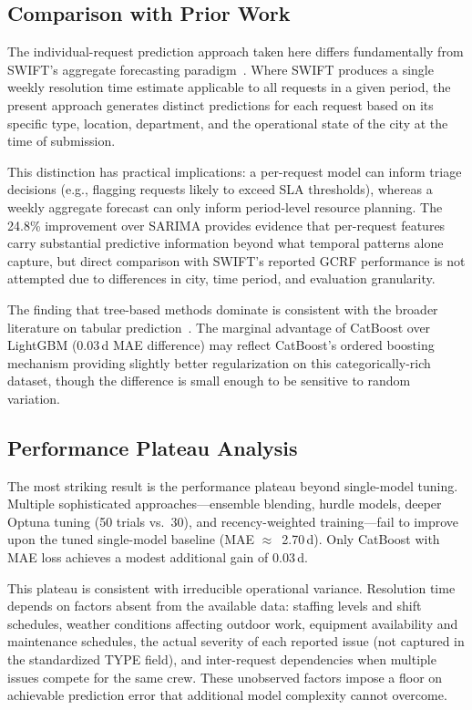 \documentclass[sigconf,nonacm]{acmart}
\begin{document}
\subsection{Comparison with Prior Work}

The individual-request prediction approach taken here
differs fundamentally from SWIFT's aggregate forecasting
paradigm~\cite{raj2021swift}. Where SWIFT produces a single
weekly resolution time estimate applicable to all requests in a
given period, the present approach generates distinct predictions
for each request based on its specific type, location,
department, and the operational state of the city at the time of
submission.

This distinction has practical implications: a per-request model
can inform triage decisions (e.g., flagging requests likely to
exceed SLA thresholds), whereas a weekly aggregate forecast can
only inform period-level resource planning. The 24.8\%
improvement over SARIMA provides evidence that per-request
features carry substantial predictive information beyond what
temporal patterns alone capture, but direct comparison with
SWIFT's reported GCRF performance is not attempted due to
differences in city, time period, and evaluation granularity.

The finding that tree-based methods dominate is consistent with
the broader literature on tabular prediction~\cite{
grinsztajn2022trees, shwartzziv2022tabular}. The marginal
advantage of CatBoost over LightGBM (0.03\,d MAE difference)
may reflect CatBoost's ordered boosting mechanism providing
slightly better regularization on this categorically-rich dataset,
though the difference is small enough to be sensitive to
random variation.

\subsection{Performance Plateau Analysis}

The most striking result is the performance plateau beyond
single-model tuning. Multiple sophisticated
approaches---ensemble blending, hurdle models, deeper Optuna
tuning (50 trials vs.\ 30), and recency-weighted
training---fail to improve upon the tuned single-model baseline
(MAE $\approx$~2.70\,d). Only CatBoost with MAE loss achieves a
modest additional gain of 0.03\,d.

This plateau is consistent with irreducible operational variance.
Resolution time depends on factors absent from the available
data: staffing levels and shift schedules, weather conditions
affecting outdoor work, equipment availability and maintenance
schedules, the actual severity of each reported issue (not
captured in the standardized TYPE field), and inter-request
dependencies when multiple issues compete for the same crew.
These unobserved factors impose a floor on achievable prediction
error that additional model complexity cannot overcome.
\end{document}
